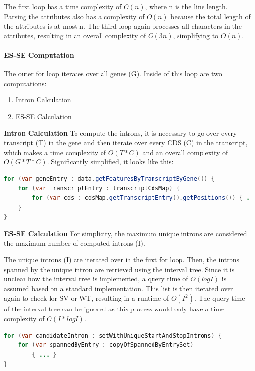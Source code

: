 \documentclass{article}
\begin{document}
    The first loop has a time complexity of $O(n)$, where n is the line length. Parsing the attributes also has a complexity of $O(n)$ because the total length of the attributes is at most n. The third loop again processes all characters in the attributes, resulting in an overall complexity of $O(3n)$, simplifying to $O(n)$.

    \paragraph{ES-SE Computation}
    The outer for loop iterates over all genes (G). Inside of this loop are two computations:

    \begin{enumerate}
        \item Intron Calculation
        \item ES-SE Calculation
    \end{enumerate}

    \textbf{Intron Calculation} To compute the introns, it is necessary to go over every transcript (T) in the gene and then iterate over every CDS (C) in the transcript, which makes a time complexity of $O(T * C) $ and an overall complexity of $O(G * T * C)$. Significantly simplified, it looks like this:

    \begin{lstlisting}[language=Java]
for (var geneEntry : data.getFeaturesByTranscriptByGene()) {
    for (var transcriptEntry : transcriptCdsMap) {
        for (var cds : cdsMap.getTranscriptEntry().getPositions()) { ... }
    }
}
    \end{lstlisting}

    \textbf{ES-SE Calculation} For simplicity, the maximum unique introns are considered the maximum number of computed introns (I).

    The unique introns (I) are iterated over in the first for loop. Then, the introns spanned by the unique intron are retrieved using the interval tree. Since it is unclear how the interval tree is implemented, a query time of $O(log I)$ is assumed based on a standard implementation. This list is then iterated over again to check for SV or WT, resulting in a runtime of $O({I}^2)$. The query time of the interval tree can be ignored as this process would only have a time complexity of $O(I * log I)$.

    \begin{lstlisting}[language=Java]
for (var candidateIntron : setWithUniqueStartAndStopIntrons) {
    for (var spannedByEntry : copyOfSpannedByEntrySet) 
        { ... }
}
    \end{lstlisting}
\end{document}
